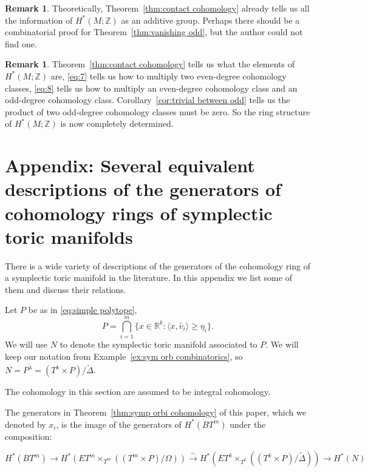 \documentclass[12pt]{amsart}
\def\Z {{\mathbb{Z}}}
\def\R {{\mathbb{R}}}
\theoremstyle{definition}
\newtheorem{remark}[theorem]{Remark}
\numberwithin{equation}{section}
\begin{document}
\begin{remark}
Theoretically, Theorem~\ref{thm:contact cohomology} already tells us
all the information of $H^{*}(M;\Z)$ as an additive group. Perhaps
there should be a combinatorial proof for Theorem~\ref{thm:vanishing
odd}, but the author could not find one.
\end{remark}

\begin{remark}
Theorem~\ref{thm:contact cohomology} tells us what the elements of
$H^{*}(M;\Z)$ are, \eqref{eq:7} tells us how to multiply two
even-degree cohomology classes, \eqref{eq:8} tells us how to
multiply an even-degree cohomology class and an odd-degree
cohomology class. Corollary~\ref{cor:trivial between odd} tells us
the product of two odd-degree cohomology classes must be zero. So
the ring structure of $H^{*}(M;\Z)$ is now completely determined.
\end{remark}


\section{\bf Appendix: Several equivalent descriptions of the
generators of cohomology rings of symplectic toric
manifolds}\label{sec:comparison}

There is a wide variety of descriptions of the generators of the
cohomology ring of a symplectic toric manifold in the literature. In
this appendix we list some of them and discuss their relations.

Let $P$ be as in \eqref{eq:simple polytope},
\begin{equation}
P=\bigcap_{i=1}^{m}\{x\in \R^k: \langle x, \tilde{v_{i}}\rangle \geq
\eta_{i}\}.
\end{equation}
We will use $N$ to denote the symplectic toric manifold associated
to $P$. We will keep our notation from Example~\ref{ex:sym orb
combinatorics}, so $N= P^{\tilde{\lambda}}= (T^k\times
P)/\tilde{\Delta}$.

The cohomology in this section are assumed to be integral
cohomology.

 The generators in Theorem~\ref{thm:symp orbi cohomology}
of this paper, which we denoted by $x_{i}$, is the image of the
generators of $H^{*}(BT^m)$ under the composition:

{\small \begin{equation}H^{*}(BT^m)\rightarrow
H^{*}(ET^m\times_{T^m}((T^m\times
P)/\Omega))\stackrel{\sim}{\rightarrow}H^{*}(ET^k\times_{T^k}((T^k\times
P)/\tilde{\Delta}))\rightarrow H^{*}(N)
\end{equation}}
\end{document}
